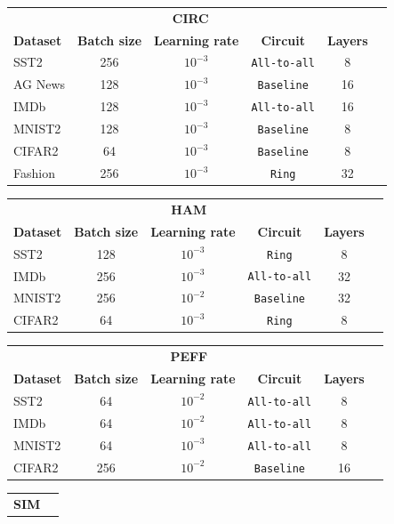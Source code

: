 \documentclass[../main.tex]{subfiles}
\begin{document}
\begin{table}
\centering
\begin{tabular}{lccccc}
\toprule
\multicolumn{5}{c}{\textbf{CIRC}} \\
\textbf{Dataset} & \textbf{Batch size} & \textbf{Learning rate} & \textbf{Circuit} & \textbf{Layers} \\
\midrule
SST2 & 256 & $10^{-3}$ & \texttt{All-to-all} & 8 \\
AG News & 128 & $10^{-3}$ & \texttt{Baseline} & 16 \\
IMDb & 128 & $10^{-3}$ & \texttt{All-to-all} & 16 \\
MNIST2 & 128 & $10^{-3}$ & \texttt{Baseline} & 8 \\
CIFAR2 & 64 & $10^{-3}$ & \texttt{Baseline} & 8 \\
Fashion & 256 & $10^{-3}$ & \texttt{Ring} & 32 \\
\bottomrule
\end{tabular}
\begin{tabular}{lccccc}
\toprule
\multicolumn{5}{c}{\textbf{HAM}} \\
\textbf{Dataset} & \textbf{Batch size} & \textbf{Learning rate} & \textbf{Circuit} & \textbf{Layers} \\
\midrule
SST2 & 128 & $10^{-3}$ & \texttt{Ring} & 8 \\
IMDb & 256 & $10^{-3}$ & \texttt{All-to-all} & 32 \\
MNIST2 & 256 & $10^{-2}$ & \texttt{Baseline} & 32 \\
CIFAR2 & 64 & $10^{-3}$ & \texttt{Ring} & 8 \\
\bottomrule
\end{tabular}
\begin{tabular}{lccccc}
\toprule
\multicolumn{5}{c}{\textbf{PEFF}} \\
\textbf{Dataset} & \textbf{Batch size} & \textbf{Learning rate} & \textbf{Circuit} & \textbf{Layers} \\
\midrule
SST2 & 64 & $10^{-2}$ & \texttt{All-to-all} & 8 \\
IMDb & 64 & $10^{-2}$ & \texttt{All-to-all} & 8 \\
MNIST2 & 64 & $10^{-3}$ & \texttt{All-to-all} & 8 \\
CIFAR2 & 256 & $10^{-2}$ & \texttt{Baseline} & 16 \\
\bottomrule
\end{tabular}
\begin{tabular}{lcccccc}
\toprule
\multicolumn{6}{c}{\textbf{SIM}} \\

\end{tabular}
\end{table}
\end{document}

